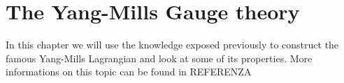 \documentclass[12pt,a4paper]{report}
\theoremstyle{definition}
\newtheorem{Def}{Definition}[chapter]
\theoremstyle{Theorem}
\newtheorem{Prop}[Def]{Proposition}
\theoremstyle{definition}
\theoremstyle{definition}
\begin{document}
	\begin{comment}
	\chapter{The Euler-Lagrange equations}
	In this chapter we will look at how to define the Euler-LAgrange equations on the framework of differential geometry. We will apply the results of this chapter in the study of the general solutions of the Yang-Mills lagrangian. REFERENZA
	\section{Lagrangians and gauge invariance}
	In this section we will give the definition of a gauge invariant Lagrangian and look at some properties of it. REFERENZA
	\begin{Def}
		Let $(P,M,\pi,G)$ be a principal $G$-bundle and $\rho:G\rightarrow GL(V)$ a representation. We define the space of \textit{1-Jets} as:
		$$J(P,V)=\{(p,v,T)|p\in P,v\in V, T:T_pP\rightarrow V \hbox{linear}\}$$
	\end{Def}
	\begin{Prop}
		The 1-Jets space is a smooth manifold.
	\end{Prop}
	\begin{proof}
		
	\end{proof}
	\end{comment}
	\chapter{The Yang-Mills Gauge theory}
	In this chapter we will use the knowledge exposed previously to construct the famous Yang-Mills Lagrangian and look at some of its properties. More informations on this topic can be found in REFERENZA
\end{document}
